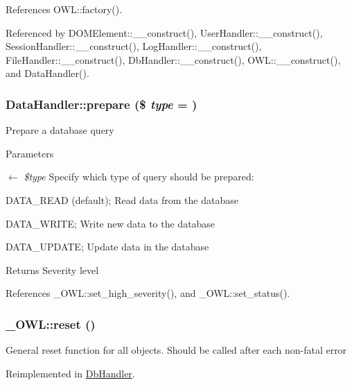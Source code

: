 References OWL::factory().



Referenced by DOMElement::\_\-\_\-construct(), UserHandler::\_\-\_\-construct(), SessionHandler::\_\-\_\-construct(), LogHandler::\_\-\_\-construct(), FileHandler::\_\-\_\-construct(), DbHandler::\_\-\_\-construct(), OWL::\_\-\_\-construct(), and DataHandler().

\subsubsection[{prepare}]{\setlength{\rightskip}{0pt plus 5cm}DataHandler::prepare (\$ {\em type} = {})}\label{classDataHandler_af3e7a17194e97300d499e9178f4913cb}
Prepare a database query


\begin{DoxyParams}{Parameters}
\item[\mbox{$\leftarrow$} {\em \$type}]Specify which type of query should be prepared:
\begin{DoxyItemize}
\item DATA\_\-READ (default); Read data from the database
\item DATA\_\-WRITE; Write new data to the database
\item DATA\_\-UPDATE; Update data in the database 
\end{DoxyItemize}\end{DoxyParams}
\begin{DoxyReturn}{Returns}
Severity level 
\end{DoxyReturn}


References \_\-OWL::set\_\-high\_\-severity(), and \_\-OWL::set\_\-status().

\subsubsection[{reset}]{\setlength{\rightskip}{0pt plus 5cm}\_\-OWL::reset ()}\label{class__OWL_a2f2a042bcf31965194c03033df0edc9b}
General reset function for all objects. Should be called after each non-\/fatal error 

Reimplemented in \hyperlink{classDbHandler_a9982df4830f05803935bb31bac7fae3d}{DbHandler}.



